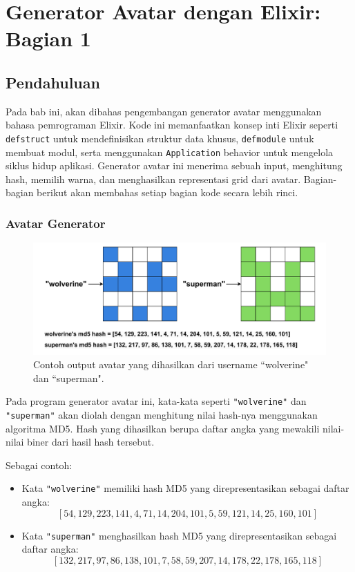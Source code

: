 \chapter{Generator Avatar dengan Elixir: Bagian 1}

\section{Pendahuluan}
Pada bab ini, akan dibahas pengembangan generator avatar menggunakan bahasa pemrograman Elixir. Kode ini memanfaatkan konsep inti Elixir seperti \texttt{defstruct} untuk mendefinisikan struktur data khusus, \texttt{defmodule} untuk membuat modul, serta menggunakan \texttt{Application} behavior untuk mengelola siklus hidup aplikasi. Generator avatar ini menerima sebuah input, menghitung hash, memilih warna, dan menghasilkan representasi grid dari avatar. Bagian-bagian berikut akan membahas setiap bagian kode secara lebih rinci.

\subsection{Avatar Generator}
\begin{figure}[h]
	\begin{center}
		\includegraphics[width=1\textwidth]{../assets/avatar-example.pdf}
	\end{center}
	\caption{Contoh output avatar yang dihasilkan dari username ``wolverine" dan ``superman".}
\end{figure}
	
Pada program generator avatar ini, kata-kata seperti \texttt{"wolverine"} dan \texttt{"superman"} akan diolah dengan menghitung nilai hash-nya menggunakan algoritma MD5. Hash yang dihasilkan berupa daftar angka yang mewakili nilai-nilai biner dari hasil hash tersebut.

Sebagai contoh:
\begin{itemize}
	\item Kata \texttt{"wolverine"} memiliki hash MD5 yang direpresentasikan sebagai daftar angka: 
	\[
	[54, 129, 223, 141, 4, 71, 14, 204, 101, 5, 59, 121, 14, 25, 160, 101]
	\]
	\item Kata \texttt{"superman"} menghasilkan hash MD5 yang direpresentasikan sebagai daftar angka:
	\[
	[132, 217, 97, 86, 138, 101, 7, 58, 59, 207, 14, 178, 22, 178, 165, 118]
	\]
\end{itemize}

